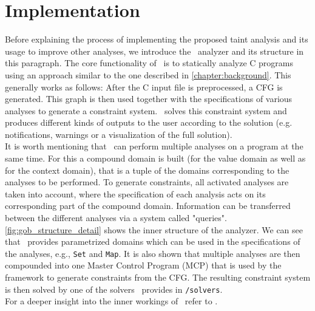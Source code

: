   \section{Implementation}\label{sec:implementation}
  Before explaining the process of implementing the proposed taint analysis and its usage to improve other analyses, we introduce the \gob\ analyzer and its structure in this paragraph. The core functionality of \gob\ is to statically analyze C programs using an approach similar to the one described in \autoref{chapter:background}. This generally works as follows: After the C input file is preprocessed, a \ac{CFG} is generated. This graph is then used together with the specifications of various analyses to generate a constraint system. \gob\ solves this constraint system and produces different kinds of outputs to the user according to the solution (e.g. notifications, warnings or a visualization of the full solution).\\
  It is worth mentioning that \gob\ can perform multiple analyses on a program at the same time. For this a compound domain is built (for the value domain as well as for the context domain), that is a tuple of the domains corresponding to the analyses to be performed. To generate constraints, all activated analyses are taken into account, where the specification of each analysis acts on its corresponding part of the compound domain. Information can be transferred between the different analyses via a system called "queries".\\
  \autoref{fig:gob_structure_detail} shows the inner structure of the analyzer. We can see that \gob\ provides parametrized domains which can be used in the specifications of the analyses, e.g., \texttt{Set} and \texttt{Map}. It is also shown that multiple analyses are then compounded into one Master Control Program (MCP) that is used by the framework to generate constraints from the \ac{CFG}. The resulting constraint system is then solved by one of the solvers \gob\ provides in \texttt{/solvers}.\\  
  For a deeper insight into the inner workings of \gob\ refer to \parencite{apinis2014frameworks}.
  
